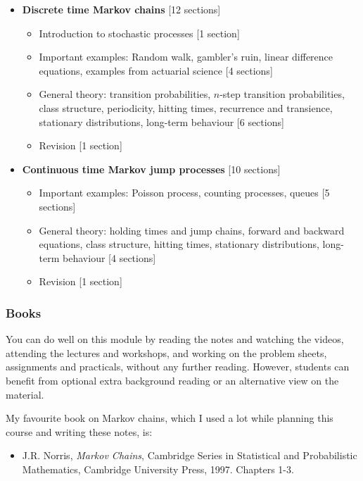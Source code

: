 \documentclass[
  a4paper,
]{article}
\providecommand{\tightlist}{%
  \setlength{\itemsep}{0pt}\setlength{\parskip}{0pt}}
\theoremstyle{definition}
\theoremstyle{definition}
\theoremstyle{definition}
\theoremstyle{remark}
\begin{document}
\begin{itemize}
\tightlist
\item
  \textbf{Discrete time Markov chains} {[}12 sections{]}

  \begin{itemize}
  \tightlist
  \item
    Introduction to stochastic processes {[}1 section{]}
  \item
    Important examples: Random walk, gambler's ruin, linear difference equations, examples from actuarial science {[}4 sections{]}
  \item
    General theory: transition probabilities, \(n\)-step transition probabilities, class structure, periodicity, hitting times, recurrence and transience, stationary distributions, long-term behaviour {[}6 sections{]}
  \item
    Revision {[}1 section{]}
  \end{itemize}
\item
  \textbf{Continuous time Markov jump processes} {[}10 sections{]}

  \begin{itemize}
  \tightlist
  \item
    Important examples: Poisson process, counting processes, queues {[}5 sections{]}
  \item
    General theory: holding times and jump chains, forward and backward equations, class structure, hitting times, stationary distributions, long-term behaviour {[}4 sections{]}
  \item
    Revision {[}1 section{]}
  \end{itemize}
\end{itemize}

\hypertarget{books}{%
\subsubsection*{Books}\label{books}}

You can do well on this module by reading the notes and watching the videos, attending the lectures and workshops, and working on the problem sheets, assignments and practicals, without any further reading. However, students can benefit from optional extra background reading or an alternative view on the material.

My favourite book on Markov chains, which I used a lot while planning this course and writing these notes, is:

\begin{itemize}
\tightlist
\item
  J.R. Norris, \emph{Markov Chains}, Cambridge Series in Statistical and Probabilistic Mathematics, Cambridge University Press, 1997. Chapters 1-3.
\end{itemize}
\end{document}
